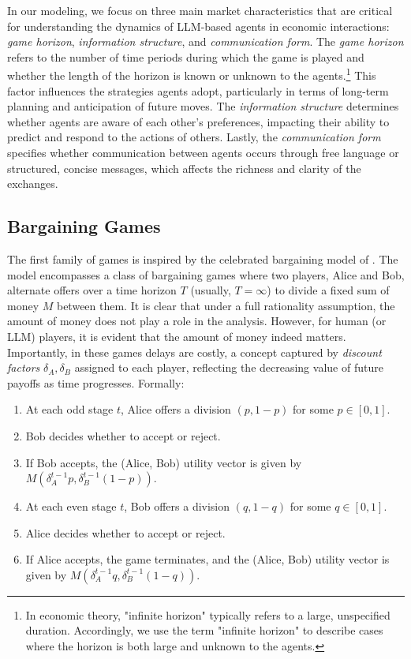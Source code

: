 In our modeling, we focus on three main market characteristics that are critical for understanding the dynamics of LLM-based agents in economic interactions: \emph{game horizon}, \emph{information structure}, and \emph{communication form}. The \emph{game horizon} refers to the number of time periods during which the game is played and whether the length of the horizon is known or unknown to the agents.\footnote{In economic theory, "infinite horizon" typically refers to a large, unspecified duration. Accordingly, we use the term "infinite horizon" to describe cases where the horizon is both large and unknown to the agents.}
This factor influences the strategies agents adopt, particularly in terms of long-term planning and anticipation of future moves. The \emph{information structure} determines whether agents are aware of each other's preferences, impacting their ability to predict and respond to the actions of others. Lastly, the \emph{communication form} specifies whether communication between agents occurs through free language or structured, concise messages, which affects the richness and clarity of the exchanges.

\subsection{Bargaining Games}

The first family of games is inspired by the celebrated bargaining model of \citet{rubinstein1982perfect}. The model encompasses a class of bargaining games where two players, Alice and Bob, alternate offers over a time horizon $T$ (usually, $T=\infty$) to divide a fixed sum of money $M$ between them. It is clear that under a full rationality assumption, the amount of money does not play a role in the analysis. However, for human (or LLM) players, it is evident that the amount of money indeed matters. Importantly, in these games delays are costly, a concept captured by \emph{discount factors} $\delta_A, \delta_B$ assigned to each player, reflecting the decreasing value of future payoffs as time progresses. Formally:

\begin{enumerate}
    \item At each odd stage $t$, Alice offers a division $(p,1-p)$ for some $p\in[0,1]$.
    \item Bob decides whether to accept or reject.
    \item If Bob accepts, the (Alice, Bob) utility vector is given by $M(\delta_A^{t-1} p, \delta_B^{t-1} (1-p))$.
    \item At each even stage $t$, Bob offers a division $(q,1-q)$ for some $q\in[0,1]$.
    \item Alice decides whether to accept or reject.
    \item If Alice accepts, the game terminates, and the (Alice, Bob) utility vector is given by $M(\delta_A^{t-1} q, \delta_B^{t-1} (1-q))$.
\end{enumerate}
  

